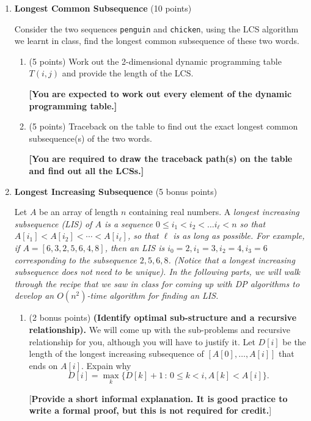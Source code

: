\documentclass[12pt]{article}
\begin{document}
\begin{enumerate}

\item \textbf{Longest Common Subsequence} (10 points)

Consider the two sequences \texttt{penguin} and \texttt{chicken}, using the LCS algorithm we learnt in class, find the longest common subsequence of these two words.
\begin{enumerate}
\item (5 points) Work out the 2-dimensional dynamic programming table $T(i,j)$ and provide the length of the LCS. 

\textbf{[You are expected to work out every element of the dynamic programming table.]}

\item (5 points) Traceback on the table to find out the exact longest common subsequence(s) of the two words.

\textbf{[You are required to draw the traceback path(s) on the table and find out all the LCSs.]}
\end{enumerate}

\item \textbf{Longest Increasing Subsequence} (5 bonus points)

Let $A$ be an array of length $n$ containing real numbers.  A \em longest increasing subsequence \em (LIS) of $A$ is a sequence $0 \leq i_1 < i_2 < \ldots i_\ell < n$ so that $A[i_1] < A[i_2] < \cdots < A[i_\ell]$, so that $\ell$ is as long as possible.  For example, if 
$A = [6,3,2,5,6,4,8]$, then an LIS is $i_0 = 2, i_1 = 3, i_2 = 4, i_3 = 6$ corresponding to the subsequence $2,5,6,8$.  (Notice that a longest increasing subsequence does not need to be unique). In the following parts, we will walk through the recipe that we saw in class for coming up with DP algorithms to develop an $O(n^2)$-time algorithm for finding an LIS. 

\begin{enumerate}

\item (2 bonus points) \textbf{(Identify optimal sub-structure and a recursive relationship).}  We will come up with the sub-problems and recursive relationship for you, although you will have to justify it.  Let $D[i]$ be the length of the longest increasing subsequence of $[A[0], \ldots, A[i]]$ that ends on $A[i]$.
Expain why
\[ D[i] = \max_k\{ D[k] + 1\,:\, 0 \leq k < i, A[k] < A[i] \}. \]

[\textbf{Provide a short informal explanation. It is good practice to write a formal proof, but this is not required for credit.}]


\end{enumerate}
\end{enumerate}
\end{document}
